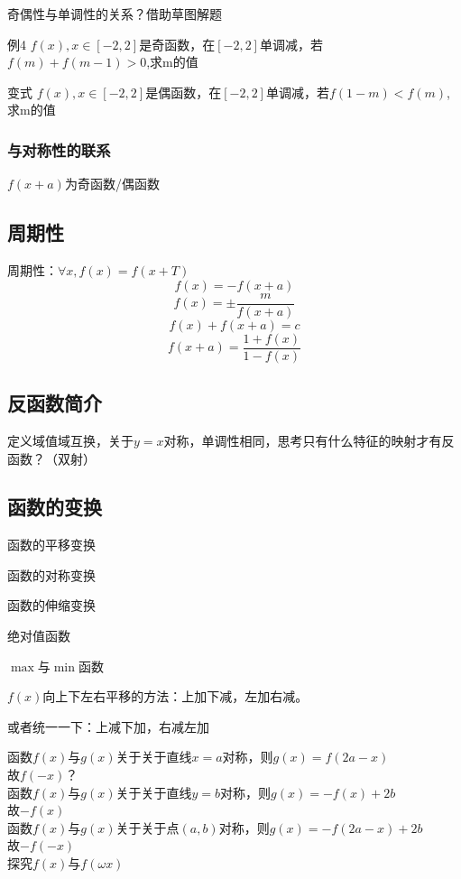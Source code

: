 奇偶性与单调性的关系？借助草图解题

例4 $f(x),x\in [-2,2]$是奇函数，在$[-2,2]$单调减，若$f(m)+f(m-1)>0$,求m的值

变式 $f(x),x\in [-2,2]$是偶函数，在$[-2,2]$单调减，若$f(1-m)<f(m)$,求m的值

\subsubsection*{与对称性的联系}
$f(x+a)$为奇函数/偶函数
\clearpage

\subsection{周期性}
\begin{definition}
    
\end{definition}
\begin{theorem}
    
\end{theorem}
周期性：$\forall x,f(x)=f(x+T)$
\[f(x)=-f(x+a)\]
\[f(x)=\pm\frac{m}{f(x+a)}\] 
\[f(x)+f(x+a)=c\]
\[f(x+a)=\frac{1+f(x)}{1-f(x)}\]
\begin{example}
    
\end{example}
\clearpage



\subsection{反函数简介}
定义域值域互换，关于$y=x$对称，单调性相同，思考只有什么特征的映射才有反函数？（双射）


\clearpage
\subsection{函数的变换}
\begin{know}
    \item 函数的平移变换
    \item 函数的对称变换
    \item 函数的伸缩变换
    \item 绝对值函数
    \item \(\max\)与\(\min\)函数
\end{know}
$f(x)$向上下左右平移的方法：上加下减，左加右减。

或者统一一下：上减下加，右减左加

函数$f(x)$与$g(x)$关于关于直线$x=a$对称，则$g(x)=f(2a-x)$
\\故$f(-x)$？
\\函数$f(x)$与$g(x)$关于关于直线$y=b$对称，则$g(x)=-f(x)+2b$
\\故$-f(x)$
\\函数$f(x)$与$g(x)$关于关于点$(a,b)$对称，则$g(x)=-f(2a-x)+2b$
\\故$-f(-x)$
\\探究$f(x)$与$f(\omega x)$

